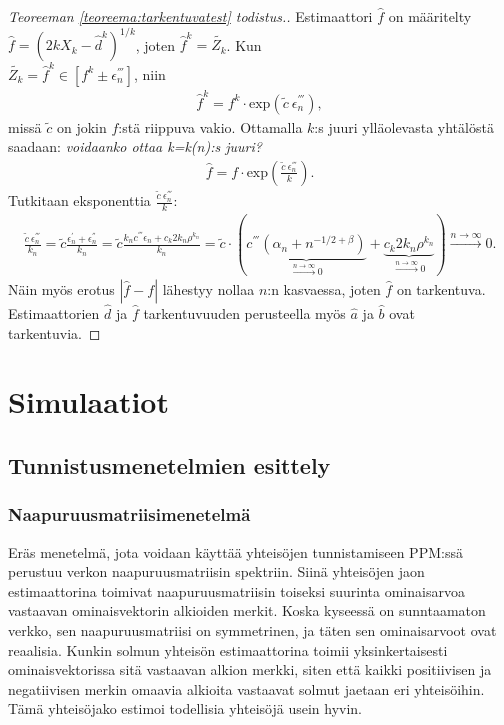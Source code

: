 \documentclass[finnish,12pt,a4paper,pdftex,sci,utf8]{aaltothesis}
\begin{document}
\begin{proof}[Teoreeman \ref{teoreema:tarkentuvatest} todistus.]
	Estimaattori $\hat{f}$ on määritelty $\hat{f} = (2kX_k - \hat{d}^k)^{1/k}$, joten $\hat{f}^k = \tilde{Z_k}$. Kun \\ $\tilde{Z_k} = \hat{f}^k \in [f^k \pm \epsilon_{n}^{'''}]$, niin 
	\begin{align*}
			\hat{f}^k = f^k \cdot \text{exp}(\tilde{c} \ \epsilon_{n}^{'''}),
		\end{align*}
missä $\tilde{c}$ on jokin $f$:stä riippuva vakio. Ottamalla $k$:s juuri ylläolevasta yhtälöstä saadaan: \textit{voidaanko ottaa k=k(n):s juuri?}
	\begin{align*}
		\hat{f} = f \cdot \text{exp}(\frac{\tilde{c} \ \epsilon_{n}^{'''}}{k}).
	\end{align*}
	Tutkitaan eksponenttia $\frac{\tilde{c} \ \epsilon_{n}^{'''}}{k}$:
	\begin{align*}
		\frac{\tilde{c} \ \epsilon_{n}^{'''}}{k_n} = \tilde{c} \frac{\epsilon_{n}^{'} + \epsilon_{n}^{''}}{k_n} = \tilde{c} \frac{k_n c^{'''} \epsilon_{n}^{} + c_k 2k_n \rho^{k_n}}{k_n} = \tilde{c} \cdot (\underbrace{c^{'''} (\alpha_n + n^{-1/2 + \beta})}_{\xrightarrow{n \rightarrow \infty} 0} + \underbrace{c_k 2k_n \rho^{k_n}}_{\xrightarrow{n \rightarrow \infty} 0}) \xrightarrow{n \rightarrow \infty} 0.
	\end{align*}
	Näin myös erotus $|\hat{f} - f| $ lähestyy nollaa $n$:n kasvaessa, joten $\hat{f}$ on tarkentuva. Estimaattorien $\hat{d}$ ja $\hat{f}$ tarkentuvuuden perusteella myös $\hat{a}$ ja $\hat{b}$ ovat tarkentuvia.
\end{proof}

\clearpage
\section{Simulaatiot}

\subsection{Tunnistusmenetelmien esittely}

\subsubsection{Naapuruusmatriisimenetelmä}
Eräs menetelmä, jota voidaan käyttää yhteisöjen tunnistamiseen PPM:ssä perustuu verkon naapuruusmatriisin spektriin. Siinä yhteisöjen jaon estimaattorina toimivat naapuruusmatriisin toiseksi suurinta ominaisarvoa vastaavan ominaisvektorin alkioiden merkit. Koska kyseessä on sunntaamaton verkko, sen naapuruusmatriisi on symmetrinen, ja täten sen ominaisarvoot ovat reaalisia. Kunkin solmun yhteisön estimaattorina toimii yksinkertaisesti ominaisvektorissa sitä vastaavan alkion merkki, siten että kaikki positiivisen ja negatiivisen merkin omaavia alkioita vastaavat solmut jaetaan eri yhteisöihin. Tämä yhteisöjako estimoi todellisia yhteisöjä usein hyvin.
\end{document}
